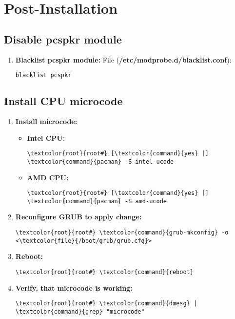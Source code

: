 \documentclass[10pt, a4paper, onecolumn, openany]{book} %
\begin{document}
\chapter{Post-Installation}
\section{Disable pcspkr module}
\begin{enumerate}
    \item \textbf{Blacklist pcspkr module:}
\newline File (\textbf{\textcolor{file}{/etc/modprobe.d/blacklist.conf}}):
\begin{Verbatim}[commandchars=\\\{\}]
blacklist pcspkr
\end{Verbatim}
\end{enumerate}
\section{Install CPU microcode}
\begin{enumerate}
    \item \textbf{Install microcode:}
    \begin{itemize}
        \item \textbf{Intel CPU:}
\begin{Verbatim}[commandchars=\\\{\}]
\textcolor{root}{root#} [\textcolor{command}{yes} |] \textcolor{command}{pacman} -S intel-ucode
\end{Verbatim}        
        \item \textbf{AMD CPU:}
\begin{Verbatim}[commandchars=\\\{\}]
\textcolor{root}{root#} [\textcolor{command}{yes} |] \textcolor{command}{pacman} -S amd-ucode
\end{Verbatim}             
    \end{itemize}
    \item \textbf{Reconfigure GRUB to apply change:}
\begin{Verbatim}[commandchars=\\\{\}]
\textcolor{root}{root#} \textcolor{command}{grub-mkconfig} -o <\textcolor{file}{/boot/grub/grub.cfg}>
\end{Verbatim}    
    \item \textbf{Reboot:}
\begin{Verbatim}[commandchars=\\\{\}]
\textcolor{root}{root#} \textcolor{command}{reboot}
\end{Verbatim}       
    \item \textbf{Verify, that microcode is working:}
\begin{Verbatim}[commandchars=\\\{\}]
\textcolor{root}{root#} \textcolor{command}{dmesg} | \textcolor{command}{grep} "microcode"
\end{Verbatim}   
\end{enumerate}
\end{document}
